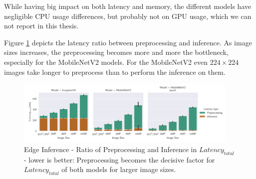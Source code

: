 While having big impact on both latency and memory, the different models have 
negligible CPU usage differences, but probably not on GPU usage, which we can not report in this thesis.





Figure \ref{fig:EdgeInferenceRatio} depicts the latency ratio between preprocessing and inference.
As image sizes increases, the preprocessing becomes more and more the bottleneck, especially for the MobileNetV2 models.
For the MobileNetV2 even $224\times224$ images take longer to preprocess than to perform the inference on them.
\begin{figure}[!htb]
\centering
\includegraphics[width=0.95\textwidth]{./Bilder/single_plots/edge_inference_plots/Edge_Preprocessing_+_Inference.pdf}
\caption[Edge Inference - Ratio of Preprocessing and Inference in $Latency_{total}$]{Edge Inference - Ratio of Preprocessing and Inference in $Latency_{total}$ - lower is better: Preprocessing becomes the decisive factor for $Latency_{total}$ of both models for larger image sizes.}
\label{fig:EdgeInferenceRatio}
\end{figure}


